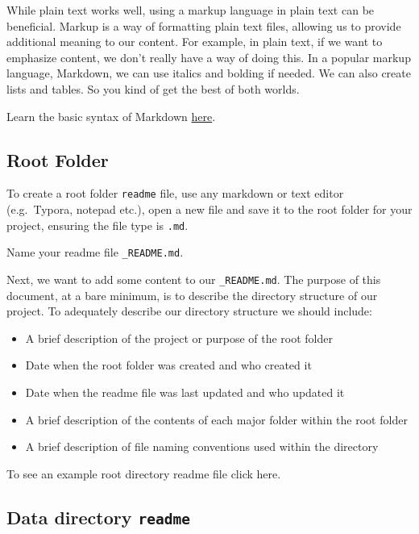 \documentclass[
]{book}
\providecommand{\tightlist}{%
  \setlength{\itemsep}{0pt}\setlength{\parskip}{0pt}}
\begin{document}
While plain text works well, using a markup language in plain text can be beneficial. Markup is a way of formatting plain text files, allowing us to provide additional meaning to our content. For example, in plain text, if we want to emphasize content, we don't really have a way of doing this. In a popular markup language, Markdown, we can use italics and bolding if needed. We can also create lists and tables. So you kind of get the best of both worlds.

Learn the basic syntax of Markdown \href{https://www.markdownguide.org/basic-syntax/}{here}.

\hypertarget{root-folder}{%
\subsection*{Root Folder}\label{root-folder}}

To create a root folder \texttt{readme} file, use any markdown or text editor (e.g.~Typora, notepad etc.), open a new file and save it to the root folder for your project, ensuring the file type is \texttt{.md}.

Name your readme file \texttt{\_README.md}.

Next, we want to add some content to our \texttt{\_README.md}. The purpose of this document, at a bare minimum, is to describe the directory structure of our project. To adequately describe our directory structure we should include:

\begin{itemize}
\tightlist
\item
  A brief description of the project or purpose of the root folder
\item
  Date when the root folder was created and who created it
\item
  Date when the readme file was last updated and who updated it
\item
  A brief description of the contents of each major folder within the root folder
\item
  A brief description of file naming conventions used within the directory
\end{itemize}

To see an example root directory readme file click here.

\hypertarget{data-directory-readme}{%
\subsection*{\texorpdfstring{Data directory \texttt{readme}}{Data directory readme}}\label{data-directory-readme}}
\end{document}
